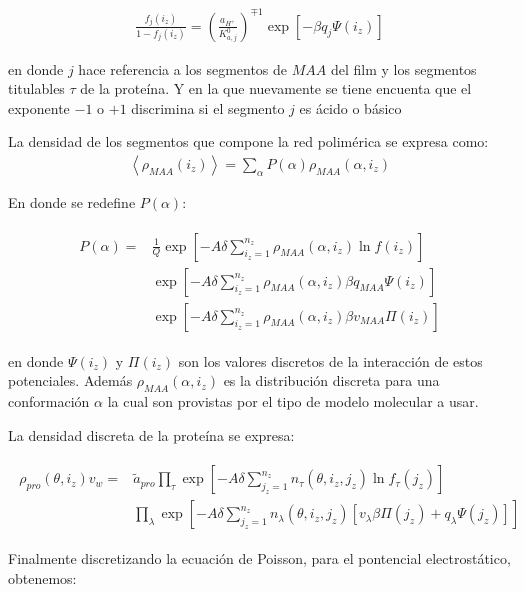 \begin{align}
	\frac{f_j(i_z)}{1-f_j(i_z)} = \left(\frac{a_{H^+}}{K^0_{a,j}}\right)^{\mp 1} \exp[-\beta q_j \Psi(i_z)]
\end{align}

\noindent en donde $j$ hace referencia a los segmentos de $MAA$ del film y los segmentos titulables $\tau$ de la prote\'ina. Y en la que nuevamente se tiene encuenta que el exponente $-1$ o $+1$ discrimina si el segmento $j$ es \'acido o b\'asico


La densidad de los segmentos que compone la red polim\'erica se expresa como:
\begin{align}
	\left< \rho_{MAA}(i_z)\right> = \sum_\alpha P(\alpha)\rho_{MAA}(\alpha, i_z)
\end{align}

En donde se redefine $P(\alpha)$:


\begin{align}
	\begin{aligned}
		P(\alpha) = &\frac{1}{Q}\exp\left[ -A \delta \sum^{n_z}_{i_z = 1} \rho_{MAA}(\alpha, i_z) \ln f(i_z)\right] \\
		&\exp\left[ -A\delta \sum^{n_z}_{i_z = 1}  \rho_{MAA}(\alpha, i_z) \beta q_{MAA} \Psi(i_z)\right] \\
		& \exp\left[ -A\delta \sum^{n_z}_{i_z = 1}  \rho_{MAA}(\alpha, i_z) \beta v_{MAA} \Pi(i_z)\right] 
	\end{aligned}
\end{align}

\noindent en donde $\Psi(i_z)$ y $\Pi(i_z)$ son los valores discretos de la interacci\'on de estos potenciales. Adem\'as $\rho_{MAA}(\alpha, i_z)$ es la distribuci\'on discreta para una conformaci\'on $\alpha$ la cual son provistas por el tipo de modelo molecular a usar.

La densidad discreta de la prote\'ina se expresa:


\begin{align}
	\begin{aligned}
		\rho_{pro}(\theta, i_z)v_w = &\tilde{a}_{pro} \prod_\tau\exp\left[-A \delta \sum^{n_z}_{j_z = 1} n_\tau(\theta,i_z,j_z) \ln f_\tau(j_z)\right] \\
		& \prod_\lambda \exp \left[-A \delta \sum^{n_z}_{j_z = 1}  n_\lambda(\theta,i_z, j_z)[v_\lambda\beta\Pi(j_z) + q_\lambda \Psi(j_z)] \right]
	\end{aligned}
\end{align}

Finalmente discretizando la ecuaci\'on de Poisson, para el pontencial electrost\'atico, obtenemos:

